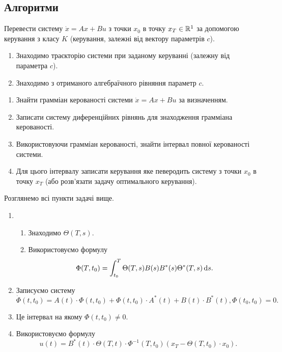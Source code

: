 \subsection{Алгоритми}

\begin{problem*}
	Перевести систему $\dot x = A x + B u$ з точки $x_0$ в точку $x_T \in \mathbb{R}^1$ за допомогою керування з класу $K$ (керування, залежні від вектору параметрів $c$).
\end{problem*}

\begin{algorithm}
	\begin{enumerate}
		\item Знаходимо траєкторію системи при заданому керуванні (залежну від параметра $c$). 
		\item Знаходимо з отриманого алгебраїчного рівняння параметр $c$.
	\end{enumerate}
\end{algorithm}

\begin{problem*}
	\begin{enumerate}
		\item Знайти грамміан керованості системи $\dot x = A x + B u$ за визначенням.
		\item Записати систему диференційних рівнянь для знаходження грамміана керованості.
		\item Використовуючи грамміан керованості, знайти інтервал повної керованості системи.
		\item Для цього інтервалу записати керування яке певеродить систему з точки $x_0$ в точку $x_T$ (або розв'язати задачу оптимального керування).
	\end{enumerate}
\end{problem*}

\begin{algorithm}
	Розглянемо всі пункти задачі вище.
	\begin{enumerate}
		\item \begin{enumerate}
			\item Знаходимо $\Theta(T,s)$.
			\item Використовуємо формулу \[\Phi(T, t_0) = \int_{t_0}^T \Theta(T, s) B(s) B^*(s) \Theta^*(T, s) \mathop{}\!\mathrm{d} s.\]
		\end{enumerate}
		\item Записуємо систему \[ \dot \Phi(t, t_0) = A(t) \cdot \Phi(t,t_0)+\Phi(t,t_0)\cdot A^*(t)+B(t)\cdot B^*(t), \Phi(t_0,t_0) = 0. \]
		\item Це інтервал на якому $\Phi(t,t_0) \ne 0$.
		\item Використовуємо формулу \[ u (t) = B^*(t) \cdot \Theta(T,t)\cdot\Phi^{-1}(T,t_0)(x_T-\Theta(T,t_0)\cdot x_0). \]
	\end{enumerate}
\end{algorithm}


